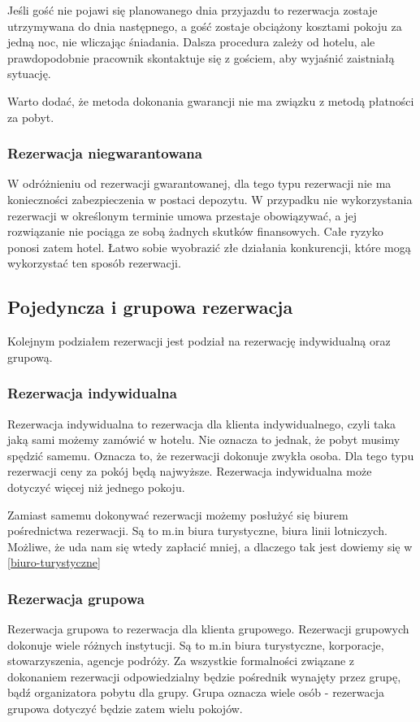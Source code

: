\documentclass[a4paper,onecolumn,oneside,11pt,wide,floatssmall]{mwrep}
\theoremstyle{definition}
\theoremstyle{plain}%
\theoremstyle{remark}
\begin{document}
Jeśli gość nie pojawi się planowanego dnia przyjazdu to rezerwacja zostaje 
utrzymywana do dnia następnego, a gość zostaje obciążony kosztami pokoju za 
jedną noc, nie wliczając śniadania. Dalsza procedura zależy od hotelu, ale 
prawdopodobnie pracownik skontaktuje się z gościem, aby wyjaśnić zaistniałą 
sytuację.

Warto dodać, że metoda dokonania gwarancji nie ma związku z metodą płatności 
za pobyt.

\subsubsection{Rezerwacja niegwarantowana}
W odróżnieniu od rezerwacji gwarantowanej, dla tego typu rezerwacji nie ma 
konieczności zabezpieczenia w postaci depozytu. W przypadku nie 
wykorzystania rezerwacji w określonym terminie umowa przestaje obowiązywać, 
a jej rozwiązanie nie pociąga ze sobą żadnych skutków finansowych. Całe 
ryzyko ponosi zatem hotel. Łatwo sobie wyobrazić złe działania konkurencji, 
które mogą wykorzystać ten sposób rezerwacji.

\subsection{Pojedyncza i grupowa rezerwacja}
Kolejnym podziałem rezerwacji jest podział na rezerwację indywidualną oraz 
grupową. 

\subsubsection{Rezerwacja indywidualna}
Rezerwacja indywidualna to rezerwacja dla klienta indywidualnego, czyli taka 
jaką sami możemy zamówić w hotelu. Nie oznacza to jednak, że pobyt musimy 
spędzić samemu. Oznacza to, że rezerwacji dokonuje zwykła osoba. Dla tego 
typu rezerwacji ceny za pokój będą najwyższe.
Rezerwacja indywidualna może dotyczyć więcej niż jednego pokoju.

Zamiast samemu dokonywać rezerwacji możemy posłużyć się biurem pośrednictwa 
rezerwacji. Są to m.in biura turystyczne, biura linii lotniczych. Możliwe, 
że uda nam się wtedy zapłacić mniej, a dlaczego tak jest dowiemy się w 
\ref{biuro-turystyczne}

\subsubsection{Rezerwacja grupowa}
\label{rezerwacja-grupowa}
Rezerwacja grupowa to rezerwacja dla klienta grupowego. Rezerwacji grupowych 
dokonuje wiele różnych instytucji. Są to m.in biura turystyczne, korporacje, 
stowarzyszenia, agencje podróży. Za wszystkie formalności związane z 
dokonaniem rezerwacji odpowiedzialny będzie pośrednik wynajęty przez grupę, 
bądź organizatora pobytu dla grupy. Grupa oznacza wiele osób - rezerwacja 
grupowa dotyczyć będzie zatem wielu pokojów. 
\end{document}
